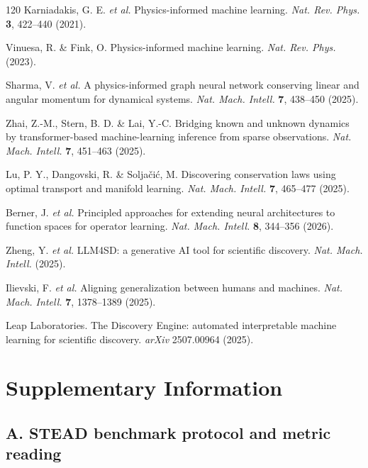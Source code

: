 \documentclass[twocolumn, 10pt]{article}
\begin{document}
\begin{thebibliography}{120}
 Karniadakis, G. E. \emph{et al.} Physics-informed machine learning. \emph{Nat. Rev. Phys.} \textbf{3}, 422--440 (2021).

 Vinuesa, R. \& Fink, O. Physics-informed machine learning. \emph{Nat. Rev. Phys.} (2023).

 Sharma, V. \emph{et al.} A physics-informed graph neural network conserving linear and angular momentum for dynamical systems. \emph{Nat. Mach. Intell.} \textbf{7}, 438--450 (2025).

 Zhai, Z.-M., Stern, B. D. \& Lai, Y.-C. Bridging known and unknown dynamics by transformer-based machine-learning inference from sparse observations. \emph{Nat. Mach. Intell.} \textbf{7}, 451--463 (2025).

 Lu, P. Y., Dangovski, R. \& Soljačić, M. Discovering conservation laws using optimal transport and manifold learning. \emph{Nat. Mach. Intell.} \textbf{7}, 465--477 (2025).

 Berner, J. \emph{et al.} Principled approaches for extending neural architectures to function spaces for operator learning. \emph{Nat. Mach. Intell.} \textbf{8}, 344--356 (2026).

 Zheng, Y. \emph{et al.} LLM4SD: a generative AI tool for scientific discovery. \emph{Nat. Mach. Intell.} (2025).

 Ilievski, F. \emph{et al.} Aligning generalization between humans and machines. \emph{Nat. Mach. Intell.} \textbf{7}, 1378--1389 (2025).

 Leap Laboratories. The Discovery Engine: automated interpretable machine learning for scientific discovery. \emph{arXiv} 2507.00964 (2025).

\end{thebibliography}


\onecolumn
\section*{Supplementary Information}

\subsection*{A. STEAD benchmark protocol and metric reading}
\end{document}
